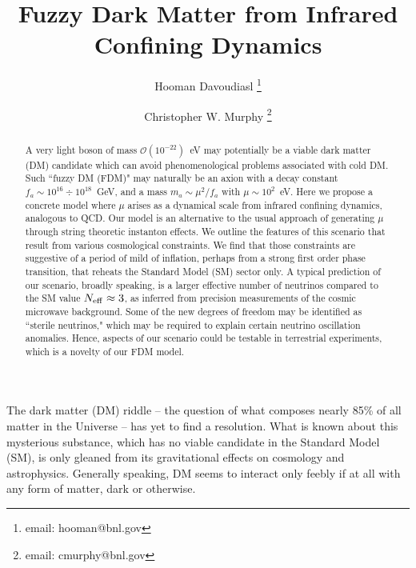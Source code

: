 \documentclass[twocolumn,preprintnumbers,
endnote,prl]{revtex4-1}
\newcommand{\ord}[1]{\mathcal{O}{(#1)}}
\newcommand{\Neff}{N_{\rm eff}}
\begin{document}
\pagestyle{plain}


\title{\boldmath Fuzzy Dark Matter from Infrared Confining Dynamics}

\author{Hooman Davoudiasl
\footnote{email: hooman@bnl.gov}
}

\author{Christopher W. Murphy
\footnote{email: cmurphy@bnl.gov}
}




\begin{abstract}

A very light boson of mass $\ord{10^{-22}}$~eV may potentially be a viable dark matter (DM) candidate 
which can avoid phenomenological problems associated with cold DM.  Such ``fuzzy DM (FDM)" may naturally 
be an axion with a decay constant $f_a \sim 10^{16} \div 10^{18}$~GeV, and a mass $m_a \sim \mu^2/f_a$ with $\mu\sim 10^2$~eV.  Here we propose a concrete model where $\mu$ arises as a dynamical scale
from infrared confining dynamics, analogous to QCD. Our model is an alternative to the usual approach of generating $\mu$ through string theoretic instanton effects.  
We outline the features of this scenario that result from  
various cosmological constraints.  We find that those constraints are suggestive of a period of mild of inflation, perhaps from a 
strong first order phase transition, that reheats the Standard Model (SM) sector only.   A typical prediction 
of our scenario, broadly speaking, is a larger effective number of neutrinos compared to  the SM value $\Neff \approx 3$, as 
inferred from precision measurements of the cosmic microwave background.  Some of the new degrees of freedom may be 
identified as ``sterile neutrinos," which may be required to explain certain neutrino oscillation anomalies. Hence, aspects of our scenario could be testable in terrestrial experiments, which is a novelty of our FDM model.

\end{abstract} 
\maketitle

The dark matter (DM) riddle -- the question of what composes nearly 85\% of all matter in the Universe -- has yet to find a 
resolution.  What is known about this mysterious substance, which has no viable candidate in the Standard Model (SM), is only gleaned from its gravitational effects on cosmology and 
astrophysics.  Generally speaking, DM seems to interact only feebly if at all with any form of matter, dark or otherwise.  
\end{document}
